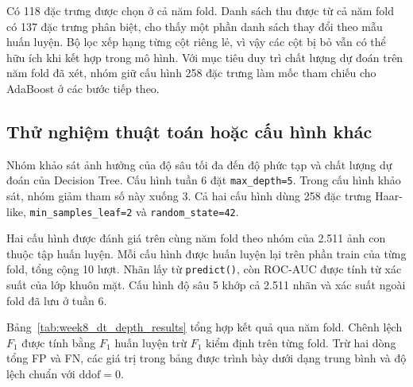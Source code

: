 \documentclass[12pt,a4paper,oneside]{report}
\begin{document}
Có 118 đặc trưng được chọn ở cả năm fold. Danh sách thu được từ cả năm
fold có 137 đặc trưng phân biệt, cho thấy một phần danh sách thay đổi theo
mẫu huấn luyện. Bộ lọc xếp hạng từng cột riêng lẻ, vì vậy các cột bị bỏ
vẫn có thể hữu ích khi kết hợp trong mô hình. Với mục tiêu duy trì
chất lượng dự đoán trên năm fold đã xét, nhóm giữ cấu hình 258 đặc trưng
làm mốc tham chiếu cho AdaBoost ở các bước tiếp theo.

\subsection{Thử nghiệm thuật toán hoặc cấu hình khác}
\label{subsec:week8_dt_depth}

Nhóm khảo sát ảnh hưởng của độ sâu tối đa đến độ phức tạp và chất lượng
dự đoán của Decision Tree. Cấu hình tuần 6 đặt \texttt{max\_depth=5}.
Trong cấu hình khảo sát, nhóm giảm tham số này xuống 3. Cả hai cấu hình
dùng 258 đặc trưng Haar-like, \texttt{min\_samples\_leaf=2}
và \texttt{random\_state=42}.

Hai cấu hình được đánh giá trên cùng năm fold theo nhóm của 2.511 ảnh con
thuộc tập huấn luyện. Mỗi cấu hình được huấn luyện lại trên phần train
của từng fold, tổng cộng 10 lượt. Nhãn lấy từ \texttt{predict()}, còn
ROC-AUC được tính từ xác suất của lớp khuôn mặt. Cấu hình độ sâu 5
khớp cả 2.511 nhãn và xác suất ngoài fold đã lưu ở tuần 6.

Bảng~\ref{tab:week8_dt_depth_results} tổng hợp kết quả qua năm fold.
Chênh lệch $F_1$ được tính bằng $F_1$ huấn luyện trừ $F_1$ kiểm định trên
từng fold. Trừ hai dòng tổng FP và FN, các giá trị trong bảng được trình
bày dưới dạng trung bình và độ lệch chuẩn với $\mathrm{ddof}=0$.
\end{document}
